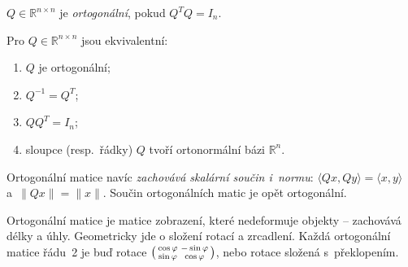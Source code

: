 \documentclass[11pt,a4paper]{article}
\begin{document}
\begin{definice}
$Q\in\mathbb{R}^{n\times n}$ je \emph{ortogonální}, pokud $Q^TQ=I_n$.
\end{definice}

\begin{veta}
Pro $Q\in\mathbb{R}^{n\times n}$ jsou ekvivalentní:
\begin{enumerate}[label=(\arabic*)]
  \item $Q$ je ortogonální;
  \item $Q^{-1}=Q^T$;
  \item $QQ^T=I_n$;
  \item sloupce (resp.\ řádky) $Q$ tvoří ortonormální bázi $\mathbb{R}^n$.
\end{enumerate}
Ortogonální matice navíc \emph{zachovává skalární součin i~normu}: $\langle Qx,Qy\rangle=\langle x,y\rangle$ a~$\|Qx\|=\|x\|$. Součin ortogonálních matic je opět ortogonální.
\end{veta}

\begin{intuice}
Ortogonální matice je matice zobrazení, které nedeformuje objekty -- zachovává délky a úhly. Geometricky jde o složení rotací a zrcadlení. Každá ortogonální matice řádu~2 je buď rotace $\begin{psmallmatrix}\cos\varphi&-\sin\varphi\\\sin\varphi&\cos\varphi\end{psmallmatrix}$, nebo rotace složená s~překlopením.
\end{intuice}
\end{document}
